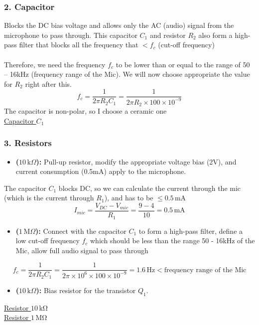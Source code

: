 \documentclass[a4paper]{article}
\numberwithin{figure}{section}
\begin{document}
\subsubsection*{2. Capacitor }
Blocks the DC bias voltage and allows only the AC (audio) signal from the microphone to pass through. This capacitor $C_1$ and resistor $R_2$ also form a high-pass filter that blocks all the frequency that $< f_c$ (cut-off frequency)\\
\\
Therefore, we need the frequency $f_c$  to be lower than or equal to the range of 50 – 16kHz (frequency range of the Mic). We will now choose appropriate the value for $R_2$ right after this.
\[
f_c=\frac{1}{2\pi R_2C_1}=\frac{1}{2\pi R_2\times100\times10^{-9}}
\]
The capacitor is non-polar, so I choose a ceramic one\\
\href{https://www.thegioiic.com/tu-gom-multilayer-100nf-0-1uf-50v}{Capacitor $C_1$}\\


\subsubsection*{3. Resistors }
\begin{itemize}
    \item \textbf{ ($10\,\text{k}\Omega$):} Pull-up resistor, modify the appropriate voltage bias (2V), and current consumption (0.5mA) apply to the microphone.
\end{itemize}
The capacitor $C_1$ blocks DC, so we can calculate the current through the mic (which is the current through $R_1$), and has to be $\le0.5 \, \text{mA}$\\
\[
I_{mic}=\frac{V_{DC}-V_{mic}}{R_1}=\frac{9-4}{10}=0.5\,\text{mA}
\]
\begin{itemize}
    \item \textbf{ ($1\,\text{M}\Omega$):} Connect with the capacitor $C_1$ to form a high-pass filter, define a low cut-off frequency $f_c$ which should be less than the range 50 - 16kHz of the Mic, allow full audio signal to pass through
\end{itemize}
$$
f_c=\frac{1}{2\pi R_2C_1}=\frac{1}{2\pi \times 10^6 \times 100 \times 10^{-9}}=1.6\,\text{Hz}<\text{frequency range of the Mic}
$$
\begin{itemize}
    \item \textbf{ ($10\,\text{k}\Omega$):} Bias resistor for the transistor $Q_1$.
\end{itemize}
\href{https://www.thegioiic.com/dien-tro-10-kohm-1-2w-1-5-vong-mau}{Resistor $10 \, \mathrm{k\Omega}$}\\
\href{https://www.thegioiic.com/dien-tro-1-mohm-1-2w-5-4-vong-mau}{Resistor $1 \, \mathrm{M\Omega}$}
\end{document}
